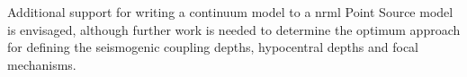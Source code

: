 Additional support for writing a continuum model to a nrml Point Source model is envisaged, although further work is needed to determine the optimum approach for defining the seismogenic coupling depths, hypocentral depths and focal mechanisms. 
 



 
 
 
  


